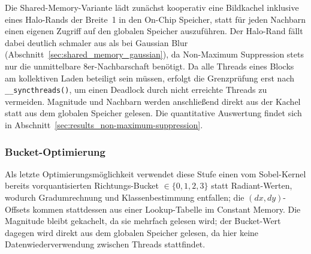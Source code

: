 Die Shared-Memory-Variante lädt zunächst kooperativ eine Bildkachel
inklusive eines Halo-Rands der Breite~1 in den On-Chip Speicher, statt
für jeden Nachbarn einen eigenen Zugriff auf den globalen Speicher
auszuführen. Der Halo-Rand fällt dabei deutlich schmaler aus als bei
Gaussian Blur (Abschnitt~\ref{sec:shared_memory_gaussian}), da
Non-Maximum Suppression stets nur die unmittelbare 8er-Nachbarschaft
benötigt. Da alle Threads eines Blocks am kollektiven Laden beteiligt
sein müssen, erfolgt die Grenzprüfung erst nach
\texttt{\_\_syncthreads()}, um einen Deadlock durch nicht erreichte
Threads zu vermeiden. Magnitude und Nachbarn werden anschließend
direkt aus der Kachel statt aus dem globalen Speicher gelesen. Die
quantitative Auswertung findet sich in
Abschnitt~\ref{sec:results_non-maximum-suppression}.

\subsubsection{Bucket-Optimierung}
\label{sec:bucket_nms}

Als letzte Optimierungsmöglichkeit verwendet diese Stufe einen vom
Sobel-Kernel bereits vorquantisierten Richtungs-Bucket $\in \{0,1,2,3\}$
statt Radiant-Werten, wodurch Gradumrechnung und Klassenbestimmung
entfallen; die $(dx, dy)$-Offsets kommen stattdessen aus einer
Lookup-Tabelle im Constant Memory. Die Magnitude bleibt gekachelt, da
sie mehrfach gelesen wird; der Bucket-Wert dagegen wird direkt aus dem
globalen Speicher gelesen, da hier keine Datenwiederverwendung
zwischen Threads stattfindet.